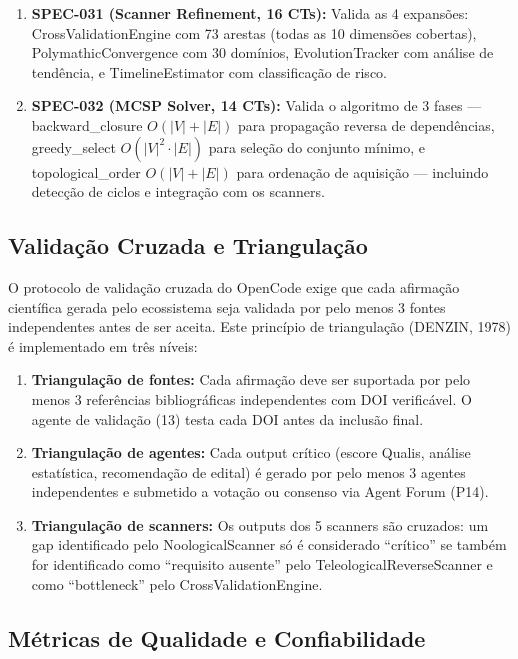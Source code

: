 \begin{enumerate}
  \item \textbf{SPEC-031 (Scanner Refinement, 16 CTs):} Valida as 4 expansões: CrossValidationEngine com 73 arestas (todas as 10 dimensões cobertas), PolymathicConvergence com 30 domínios, EvolutionTracker com análise de tendência, e TimelineEstimator com classificação de risco.

  \item \textbf{SPEC-032 (MCSP Solver, 14 CTs):} Valida o algoritmo de 3 fases --- backward\_closure $O(|V|+|E|)$ para propagação reversa de dependências, greedy\_select $O(|V|^2 \cdot |E|)$ para seleção do conjunto mínimo, e topological\_order $O(|V|+|E|)$ para ordenação de aquisição --- incluindo detecção de ciclos e integração com os scanners.
\end{enumerate}

\subsection{Validação Cruzada e Triangulação}

O protocolo de validação cruzada do OpenCode exige que cada afirmação científica gerada pelo ecossistema seja validada por pelo menos 3 fontes independentes antes de ser aceita. Este princípio de triangulação (DENZIN, 1978) é implementado em três níveis:

\begin{enumerate}
  \item \textbf{Triangulação de fontes:} Cada afirmação deve ser suportada por pelo menos 3 referências bibliográficas independentes com DOI verificável. O agente de validação (13) testa cada DOI antes da inclusão final.
  \item \textbf{Triangulação de agentes:} Cada output crítico (escore Qualis, análise estatística, recomendação de edital) é gerado por pelo menos 3 agentes independentes e submetido a votação ou consenso via Agent Forum (P14).
  \item \textbf{Triangulação de scanners:} Os outputs dos 5 scanners são cruzados: um gap identificado pelo NoologicalScanner só é considerado ``crítico'' se também for identificado como ``requisito ausente'' pelo TeleologicalReverseScanner e como ``bottleneck'' pelo CrossValidationEngine.
\end{enumerate}

\subsection{Métricas de Qualidade e Confiabilidade}

